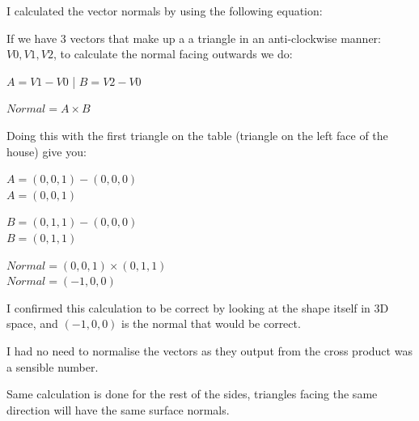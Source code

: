 \documentclass[10pt]{report}
\begin{document}
I calculated the vector normals by using the following equation:

If we have 3 vectors that make up a a triangle in an anti-clockwise manner: \(V0, V1, V2\), to calculate the normal facing outwards we do:

\(A = V1 - V0\)  |  \(B = V2 - V0\)

\(Normal = A \times B\)

Doing this with the first triangle on the table (triangle on the left face of the house) give you:

\(A = (0, 0, 1) - (0, 0, 0)\) \\ \(A = (0, 0, 1)\)

\(B = (0, 1, 1) - (0, 0, 0)\) \\ \(B = (0, 1, 1)\)

\(Normal = (0, 0, 1) \times (0, 1, 1)\) \\ \(Normal = (-1, 0, 0)\)

I confirmed this calculation to be correct by looking at the shape itself in 3D space, and \((-1, 0, 0)\) is the normal that would be correct.

I had no need to normalise the vectors as they output from the cross product was a sensible number.

Same calculation is done for the rest of the sides, triangles facing the same direction will have the same surface normals.
\end{document}
